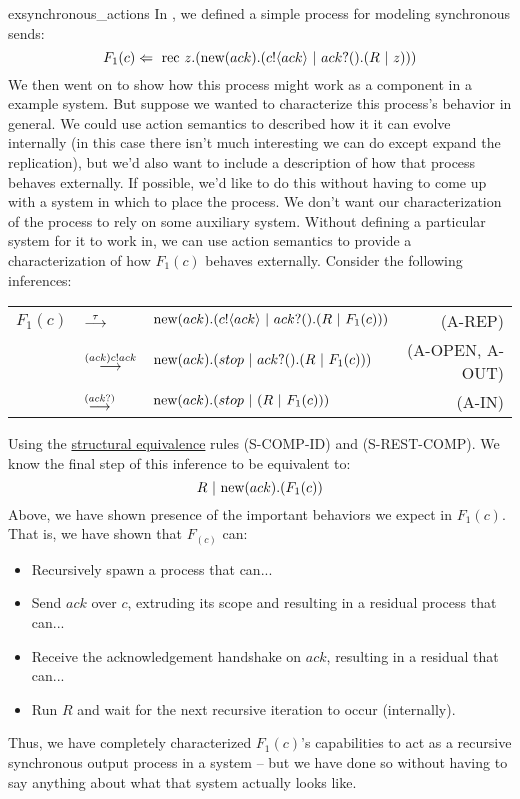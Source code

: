 \begin{example}{exsynchronous_actions}
	In , we defined a simple process for modeling synchronous sends:
\[
	F_1(c) \Leftarrow\  \text{rec }{z}. (\text{new}({ack}).({c}!\langle{ack}\rangle \ |\  {ack}?({}).(R \ |\  z)))\\
\]
We then went on to show how this process might work as a component in a example system.  
But suppose we wanted to characterize this process's behavior in general.  
We could use action semantics to described how it it can evolve internally (in this case there isn't much interesting we can do except expand the replication), but we'd also want to include a description of how that process behaves externally.  
If possible, we'd like to do this without having to come up with a system in which to place the process.  
We don't want our characterization of the process to rely on some auxiliary system.  
Without defining a particular system for it to work in, we can use action semantics to provide a characterization of how $F_1(c)$ behaves externally.  
Consider the following inferences:
\begin{center}\begin{tabular}{lllr}
	$F_1(c)$ & $\overset{{\tau}}{\longrightarrow}$ & $\text{new}({ack}).({c}!\langle{ack}\rangle \ |\  {ack}?({}).(R \ |\  F_1(c)))$ & \tiny{(A-REP)}\\
	& $\overset{{({ack}){c}!{ack}}}{\longrightarrow}$ & $\text{new}({ack}).(stop \ |\  {ack}?({}).(R \ |\  F_1(c)))$ & \tiny{(A-OPEN, A-OUT)}\\
	& $\overset{{({{ack}?{}})}}{\longrightarrow}$ & $\text{new}({ack}).(stop \ |\  (R \ |\  F_1(c))) $& \tiny{(A-IN)}\\
\end{tabular}\end{center}
Using the \hyperref[Structural Equivalence]{structural equivalence} rules (S-COMP-ID) and (S-REST-COMP).  
We know the final step of this inference to be equivalent to:
\[
	R \ |\  \text{new}({ack}).(F_1(c))
\]
Above, we have shown presence of the important behaviors we expect in $F_1(c)$.  
That is, we have shown that $F_(c)$ can:
\begin{itemize}
\item Recursively spawn a process that can...
\item Send $ack$ over $c$, extruding its scope and resulting in a residual process that can...
\item Receive the acknowledgement handshake on $ack$, resulting in a residual that can... 
\item Run $R$ and wait for the next recursive iteration to occur (internally).
\end{itemize}
Thus, we have completely characterized $F_1(c)$'s capabilities to act as a recursive synchronous output process in a system -- but we have done so without having to say anything about what that system actually looks like. 
\end{example}

